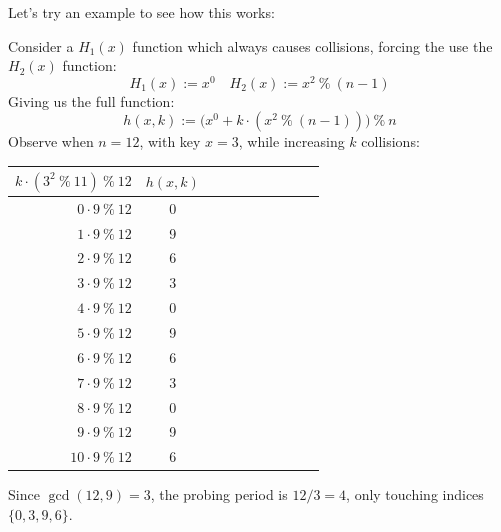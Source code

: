 \newpage 
\noindent
Let's try an example to see how this works:

\begin{Example}

    Consider a $H_1(x)$ function which always causes collisions, forcing the use the $H_2(x)$ function:
    \[
        H_1(x) := x^0 \quad H_2(x) := x^2\ \%\ (n-1)
    \]
    \noindent
    Giving us the full function:
    \[
    h(x,k) := \bigl(x^0 + k \cdot \left(x^2\ \%\ (n-1)\right)\bigr)\ \%\ n
    \]
    Observe when $n=12$, with key $x=3$, while increasing $k$ collisions:

    \begin{center}
    
 
    \setlength{\tabcolsep}{3pt}
\renewcommand{\arraystretch}{1.1}
\begin{tabular}{r|*{9}{c}}
    \multicolumn{1}{c|}{$
      k \cdot (3^2\ \%\ 11)\ \%\ 12
    $}
      & $h(x,k)$ \\
    \hline
    $0 \cdot 9\ \%\ 12$  & 0 \\
    $1 \cdot 9\ \%\ 12$  & 9   \\
    $2 \cdot 9\ \%\ 12$  & 6   \\
    $3 \cdot 9\ \%\ 12$  & 3   \\
    $4 \cdot 9\ \%\ 12$  & 0   \\
    $5 \cdot 9\ \%\ 12$  & 9   \\
    $6 \cdot 9\ \%\ 12$  & 6   \\
    $7 \cdot 9\ \%\ 12$  & 3   \\
    $8 \cdot 9\ \%\ 12$  & 0   \\
    $9 \cdot 9\ \%\ 12$  & 9   \\
    $10 \cdot 9\ \%\ 12$ & 6   \\
\end{tabular}
     \end{center}
\noindent
Since $\gcd(12, 9) = 3$, the probing period is $12/3 = 4$, only touching indices 
$\{0,3,9,6\}$.

\end{Example}



